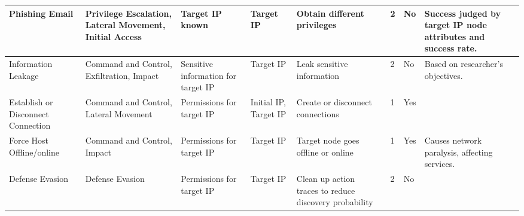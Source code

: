 \begin{table*}[t]
{\begin{tabular}{p{1.5cm}|p{3cm}|p{2cm}|p{1.4cm}|p{2.5cm}|p{2cm}|p{0.5cm}|p{1.2cm}|p{3.5cm}}
Phishing Email & Privilege Escalation, Lateral Movement, Initial Access & Target IP known & Target IP & Obtain different privileges & & 2 & No & Success judged by target IP node attributes and success rate. \\ \hline
Information Leakage & Command and Control, Exfiltration, Impact & Sensitive information for target IP & Target IP & Leak sensitive information & & 2 & No & Based on researcher's objectives. \\ \hline
Establish or Disconnect Connection & Command and Control, Lateral Movement & Permissions for target IP & Initial IP, Target IP & Create or disconnect connections & &1& Yes & \\ \hline
Force Host Offline/online & Command and Control, Impact & Permissions for target IP & Target IP & Target node goes offline or online & & 1 & Yes & Causes network paralysis, affecting services. \\ \hline
Defense Evasion & Defense Evasion & Permissions for target IP & Target IP & Clean up action traces to reduce discovery probability & & 2 & No & \\ \bottomrule[2pt]
\end{tabular}
}
\end{table*}

